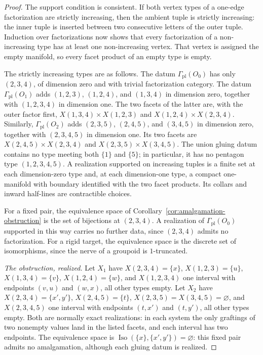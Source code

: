 \documentclass[11pt,letterpaper,twoside]{article}
\theoremstyle{plain}
\theoremstyle{definition}
\theoremstyle{remark}
\begin{document}
\begin{proof}
The support condition is consistent.  If both vertex types of a one-edge factorization are strictly increasing, then the ambient tuple is strictly increasing: the inner tuple is inserted between two consecutive letters of the outer tuple.  Induction over factorizations now shows that every factorization of a non-increasing type has at least one non-increasing vertex.  That vertex is assigned the empty manifold, so every facet product of an empty type is empty.

The strictly increasing types are as follows.  The datum \(\Gamma_{\mathrm{pl}}(O_0)\) has only \((2,3,4)\), of dimension zero and with trivial factorization category.  The datum \(\Gamma_{\mathrm{pl}}(O_1)\) adds \((1,2,3)\), \((1,2,4)\), and \((1,3,4)\) in dimension zero, together with \((1,2,3,4)\) in dimension one.  The two facets of the latter are, with the outer factor first, \(X(1,3,4)\times X(1,2,3)\) and \(X(1,2,4)\times X(2,3,4)\).  Similarly, \(\Gamma_{\mathrm{pl}}(O_2)\) adds \((2,3,5)\), \((2,4,5)\), and \((3,4,5)\) in dimension zero, together with \((2,3,4,5)\) in dimension one.  Its two facets are \(X(2,4,5)\times X(2,3,4)\) and \(X(2,3,5)\times X(3,4,5)\).  The union gluing datum contains no type meeting both \(\{1\}\) and \(\{5\}\); in particular, it has no pentagon type \((1,2,3,4,5)\).  A realization supported on increasing tuples is a finite set at each dimension-zero type and, at each dimension-one type, a compact one-manifold with boundary identified with the two facet products.  Its collars and inward half-lines are contractible choices.

For a fixed pair, the equivalence space of Corollary~\ref{cor:amalgamation-obstruction} is the set of bijections at \((2,3,4)\).  A realization of \(\Gamma_{\mathrm{pl}}(O_0)\) supported in this way carries no further data, since \((2,3,4)\) admits no factorization.  For a rigid target, the equivalence space is the discrete set of isomorphisms, since the nerve of a groupoid is \(1\)-truncated.

\emph{The obstruction, realized.}  Let \(X_1\) have \(X(2,3,4)=\{x\}\), \(X(1,2,3)=\{u\}\), \(X(1,3,4)=\{v\}\), \(X(1,2,4)=\{w\}\), and \(X(1,2,3,4)\) one interval with endpoints \((v,u)\) and \((w,x)\), all other types empty.  Let \(X_2\) have \(X(2,3,4)=\{x',y'\}\), \(X(2,4,5)=\{t\}\), \(X(2,3,5)=X(3,4,5)=\varnothing\), and \(X(2,3,4,5)\) one interval with endpoints \((t,x')\) and \((t,y')\), all other types empty.  Both are normally exact realizations: in each system the only graftings of two nonempty values land in the listed facets, and each interval has two endpoints.  The equivalence space is \(\operatorname{Iso}(\{x\},\{x',y'\})=\varnothing\): this fixed pair admits no amalgamation, although each gluing datum is realized.


\end{proof}
\end{document}
